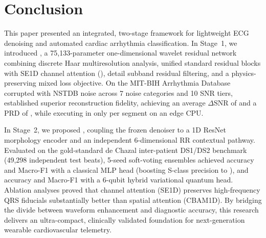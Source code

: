 \section{Conclusion}
\label{sec:conclusion}

This paper presented an integrated, two-stage framework for lightweight ECG denoising and automated cardiac arrhythmia classification. In Stage~1, we introduced \HSL, a 75{,}133-parameter one-dimensional wavelet residual network combining discrete Haar multiresolution analysis, unified standard residual blocks with SE1D channel attention (\RSE{}), detail subband residual filtering, and a physics-preserving mixed loss objective. On the MIT-BIH Arrhythmia Database corrupted with NSTDB noise across 7 noise categories and 10 SNR tiers, \HSL{} established superior reconstruction fidelity, achieving an average $\Delta\mathrm{SNR}$ of  and a $\mathrm{PRD}$ of , while executing in only  per segment on an edge CPU.

In Stage~2, we proposed \RRN, coupling the frozen denoiser to a 1D ResNet morphology encoder and an independent 6-dimensional RR contextual pathway. Evaluated on the gold-standard de Chazal inter-patient DS1/DS2 benchmark (49{,}298 independent test beats), 5-seed soft-voting ensembles achieved  accuracy and  Macro-F1 with a classical MLP head (boosting S-class precision to ), and  accuracy and  Macro-F1 with a 6-qubit hybrid variational quantum head. Ablation analyses proved that channel attention (SE1D) preserves high-frequency QRS fiducials substantially better than spatial attention (CBAM1D). By bridging the divide between waveform enhancement and diagnostic accuracy, this research delivers an ultra-compact, clinically validated foundation for next-generation wearable cardiovascular telemetry.
